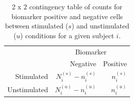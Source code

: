 \documentclass[12pt,oupdraft]{biostatistics}
\begin{document}

%

\clearpage

\begin{table}
\centering
\parbox{0.8\linewidth}{
\caption{2 x 2 contingency table of counts for biomarker positive and negative cells between stimulated ($s$) and unstimulated ($u$) conditions for a given subject $i$.}\label{tab:twobytwo}
\centering
\begin{tabular}{rrr}

  \hline
\multicolumn{1}{l}{}&
\multicolumn{2}{c}{Biomarker}\\
 & Negative & Positive \\
  \hline
Stimulated &   $N^{(s)}_{i} - n^{(s)}_{i}$ &   $n^{(s)}_{i}$ \\
Unstimulated &   $N^{(u)}_{i}-n^{(u)}_{i}$ &   $n^{(u)}_{i}$ \\
   \hline
\end{tabular}
}
\end{table}
\end{document}
